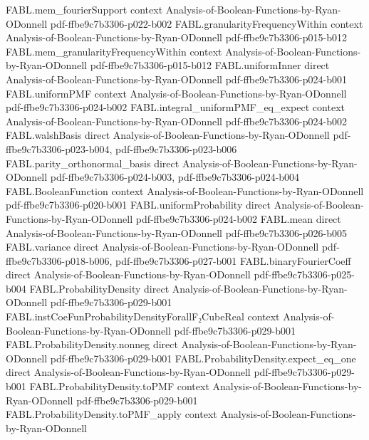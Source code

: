 \begin{theorem}
  {FABL.mem_fourierSupport}
  {context}
  {Analysis-of-Boolean-Functions-by-Ryan-ODonnell}
  {pdf-ffbe9c7b3306-p022-b002}
\proofstep
  {FABL.granularityFrequencyWithin}
  {context}
  {Analysis-of-Boolean-Functions-by-Ryan-ODonnell}
  {pdf-ffbe9c7b3306-p015-b012}
\proofstep
  {FABL.mem_granularityFrequencyWithin}
  {context}
  {Analysis-of-Boolean-Functions-by-Ryan-ODonnell}
  {pdf-ffbe9c7b3306-p015-b012}
\proofstep
  {FABL.uniformInner}
  {direct}
  {Analysis-of-Boolean-Functions-by-Ryan-ODonnell}
  {pdf-ffbe9c7b3306-p024-b001}
\proofstep
  {FABL.uniformPMF}
  {context}
  {Analysis-of-Boolean-Functions-by-Ryan-ODonnell}
  {pdf-ffbe9c7b3306-p024-b002}
\proofstep
  {FABL.integral_uniformPMF_eq_expect}
  {context}
  {Analysis-of-Boolean-Functions-by-Ryan-ODonnell}
  {pdf-ffbe9c7b3306-p024-b002}
\proofstep
  {FABL.walshBasis}
  {direct}
  {Analysis-of-Boolean-Functions-by-Ryan-ODonnell}
  {pdf-ffbe9c7b3306-p023-b004,
    pdf-ffbe9c7b3306-p023-b006}
\proofstep
  {FABL.parity_orthonormal_basis}
  {direct}
  {Analysis-of-Boolean-Functions-by-Ryan-ODonnell}
  {pdf-ffbe9c7b3306-p024-b003,
    pdf-ffbe9c7b3306-p024-b004}
\proofstep
  {FABL.BooleanFunction}
  {context}
  {Analysis-of-Boolean-Functions-by-Ryan-ODonnell}
  {pdf-ffbe9c7b3306-p020-b001}
\proofstep
  {FABL.uniformProbability}
  {direct}
  {Analysis-of-Boolean-Functions-by-Ryan-ODonnell}
  {pdf-ffbe9c7b3306-p024-b002}
\proofstep
  {FABL.mean}
  {direct}
  {Analysis-of-Boolean-Functions-by-Ryan-ODonnell}
  {pdf-ffbe9c7b3306-p026-b005}
\proofstep
  {FABL.variance}
  {direct}
  {Analysis-of-Boolean-Functions-by-Ryan-ODonnell}
  {pdf-ffbe9c7b3306-p018-b006,
    pdf-ffbe9c7b3306-p027-b001}
\proofstep
  {FABL.binaryFourierCoeff}
  {direct}
  {Analysis-of-Boolean-Functions-by-Ryan-ODonnell}
  {pdf-ffbe9c7b3306-p025-b004}
\proofstep
  {FABL.ProbabilityDensity}
  {direct}
  {Analysis-of-Boolean-Functions-by-Ryan-ODonnell}
  {pdf-ffbe9c7b3306-p029-b001}
\proofstep
  {FABL.instCoeFunProbabilityDensityForallF₂CubeReal}
  {context}
  {Analysis-of-Boolean-Functions-by-Ryan-ODonnell}
  {pdf-ffbe9c7b3306-p029-b001}
\proofstep
  {FABL.ProbabilityDensity.nonneg}
  {direct}
  {Analysis-of-Boolean-Functions-by-Ryan-ODonnell}
  {pdf-ffbe9c7b3306-p029-b001}
\proofstep
  {FABL.ProbabilityDensity.expect_eq_one}
  {direct}
  {Analysis-of-Boolean-Functions-by-Ryan-ODonnell}
  {pdf-ffbe9c7b3306-p029-b001}
\proofstep
  {FABL.ProbabilityDensity.toPMF}
  {context}
  {Analysis-of-Boolean-Functions-by-Ryan-ODonnell}
  {pdf-ffbe9c7b3306-p029-b001}
\proofstep
  {FABL.ProbabilityDensity.toPMF_apply}
  {context}
  {Analysis-of-Boolean-Functions-by-Ryan-ODonnell}

\end{theorem}
